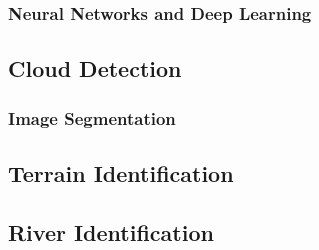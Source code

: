 \subsubsection{Neural Networks and Deep Learning}

\subsection{Cloud Detection}
\subsubsection{Image Segmentation}

\subsection{Terrain Identification}
\subsection{River Identification}



